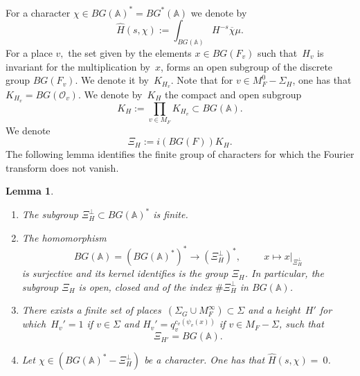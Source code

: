 \documentclass[a4paper,english,12pt]{amsart}
\newcommand{\GG}{ G}
\newcommand{\Ov}{\mathcal O _v}
\newcommand{\vMF}{v\in M_F}
\newcommand{\AAA}{\mathbb A}
\newcommand{\wH}{\widehat H}
\newtheorem{lem}[equation]{Lemma}
\numberwithin{equation}{subsection}
\begin{document}
For a character $\chi\in BG(\AAA)^*=BG^*(\AAA)$ we denote by $$ \wH(s,\chi):=\int_{BG(\AAA)}H^{-s}\overline{\chi}\mu.$$
For a place $v,$ the set given by the elements $x\in BG(F_v)$ such that~$H_v$ is invariant for the multiplication by~$x$, forms an open subgroup of the discrete group $BG(F_v)$. We denote it by~$K_{H_v}$. Note that for $v\in M_F^0-\Sigma_H$, one has that $K_{H_v}=B\GG(\Ov).$ We denote by~$K_H$ the compact and open subgroup $$K_{H}:=\prod_{\vMF}K_{H_v}\subset BG(\AAA).$$
We denote $$\Xi_H:=i(BG(F))K_H.$$ 
The following lemma identifies the finite group of characters for which the Fourier transform does not vanish.
\begin{lem}
\label{importantchar}
\begin{enumerate}
\item The subgroup $\Xi_H^{\perp}\subset BG(\AAA)^*$ is finite.
\item The homomorphism $$BG(\AAA)=(BG(\AAA)^*)^*\to (\Xi_H^\perp)^*,\hspace{1cm} x\mapsto x|_{\Xi_H^\perp}$$ is surjective and its kernel identifies is the group $\Xi_H$. In particular, the subgroup $\Xi_H$ is open, closed and of the index $\#\Xi_H^\perp$ in $BG(\AAA)$.
\item There exists a finite set of places~$(\Sigma_G\cup M_F^{\infty})\subset\Sigma$ and a height~$H'$ for which~$H_v'=1$ if $v\in \Sigma$ and $H_v'=q_v^{c_v(\psi_v(x))}$  if $v\in M_F-\Sigma$, such that $$\Xi_{H'}=BG(\AAA).$$
\item Let $\chi \in (BG(\AAA)^*-\Xi_H^{\perp})$ be a character. One has that $\wH(s,\chi)=~0$.
\end{enumerate}
\end{lem} 
\end{document}
